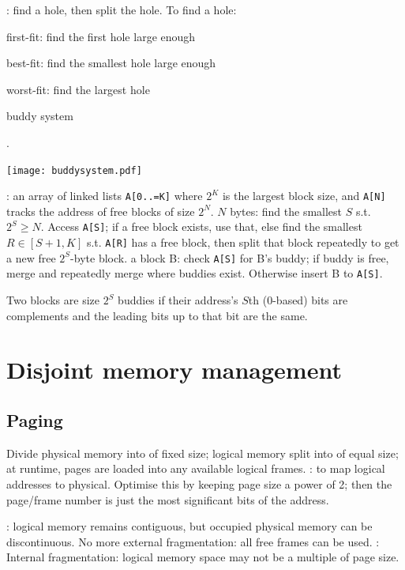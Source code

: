 \documentclass[fontsize=9pt,twoside]{slnotes}
\newcommand\benefits{\checkmark}
\newcommand\problems{\textsymbol{✗}}
\begin{document}
: find a hole, then split the hole. To find a hole: \begin{slinenumor}
\item first-fit: find the first hole large enough
\item best-fit: find the smallest hole large enough
\item worst-fit: find the largest hole
\item buddy system
\end{slinenumor}.


\texttt{[image: buddysystem.pdf]}

: an array of linked lists \texttt{A[0..=K]} where \(2^K\) is the largest block size, and \texttt{A[N]} tracks the address of free blocks of size \(2^N\).  \(N\) bytes: find the smallest \(S\) s.t. \(2^S \ge N\). Access \texttt{A[S]}; if a free block exists, use that, else find the smallest \(R \in [S+1, K]\) s.t. \texttt{A[R]} has a free block, then split that block repeatedly to get a new free \(2^S\)-byte block.  a block B: check \texttt{A[S]} for B's buddy; if buddy is free, merge and repeatedly merge where buddies exist. Otherwise insert B to \texttt{A[S]}.

Two blocks are size \(2^S\) buddies if their address's \(S\)th (0-based) bits are complements and the leading bits up to that bit are the same.

\section{Disjoint memory management}
\subsection{Paging}
Divide physical memory into  of fixed size; logical memory split into  of equal size; at runtime, pages are loaded into any available logical frames.  :  to map logical addresses to physical. Optimise this by keeping page size a power of 2; then the page/frame number is just the most significant bits of the address.

\benefits: logical memory remains contiguous, but occupied physical memory can be discontinuous. No more external fragmentation: all free frames can be used. \problems: Internal fragmentation: logical memory space may not be a multiple of page size.
\end{document}
